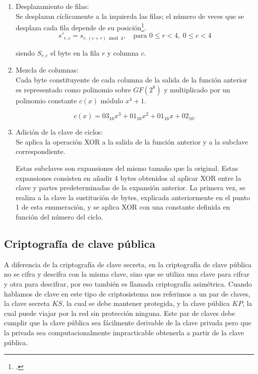 \begin{enumerate}
\begin{enumerate}
\end{enumerate}
  \item Desplazamiento de filas:\\
  
   Se desplazan cíclicamente a la izquierda las filas; el número de veces que se desplaza cada fila depende de su posición\footnote{\citep[p. 17]{NISTFIPS197} .}. 
   \[
s'_{r,c} = s_{r, (c + r) \bmod 4}, \quad \text{para } 0 \leq r < 4, \; 0 \leq c < 4 
\]

siendo $S_{r,c}$ el byte en la fila $r$ y columna $c$.

  \item Mezcla de columnas:\\

  Cada byte constituyente de cada columna de la salida de la función anterior es representado como polinomio sobre $GF(2^8)$ y multiplicado por un polinomio constante $c(x)$ módulo $x^4+1$.

  \[
c(x)= 03_{16} x^3+01_{16}x^2+01_{16}x+02_{16}.
  \]
  \item Adición de la clave de ciclos:\\

  Se aplica la operación XOR a la salida de la función anterior y a la subclave correspondiente.

  Estas subclaves son expansiones del mismo tamaño que la original. Estas expansiones consisten en añadir 4 bytes obtenidos al aplicar XOR entre la clave y partes predeterminadas de la expansión anterior. La primera vez, se realiza a la clave la sustitución de bytes, explicada anteriormente en el punto 1 de esta enumeración, y se aplica XOR con una constante definida en función del número del ciclo.

\end{enumerate}

\FloatBarrier  %
\subsection{Criptografía de clave pública }
A diferencia de la criptografía de clave secreta, en la criptografía de clave pública no se cifra y descifra con la misma clave, sino que se utiliza una clave para cifrar y otra para descifrar, por eso también es llamada criptografía asimétrica. Cuando hablamos de clave en este tipo de criptosistema nos referimos a un par de claves, la clave secreta $KS$, la cual se debe mantener protegida, y la clave pública $KP$, la cual puede viajar por la red sin protección ninguna. Este par de claves debe cumplir que la clave pública sea fácilmente derivable de la clave privada pero que la privada sea computacionalmente impracticable obtenerla a partir de la clave pública.\\


